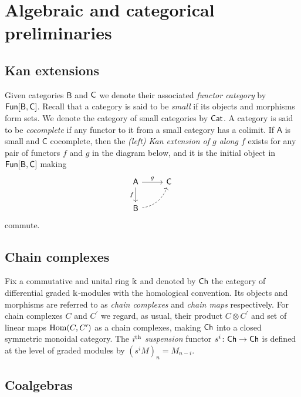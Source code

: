 
\section{Algebraic and categorical preliminaries} \label{s:preliminaries}

\subsection{Kan extensions}

Given categories $\mathsf{B}$ and $\mathsf{C}$ we denote their associated \textit{functor category} by $\mathsf{Fun}[\mathsf{B}, \mathsf{C}]$.
Recall that a category is said to be \textit{small} if its objects and morphisms form sets.
We denote the category of small categories by $\mathsf{Cat}$.
A category is said to be \textit{cocomplete} if any functor to it from a small category has a colimit.
If $\mathsf{A}$ is small and $\mathsf{C}$ cocomplete, then the \textit{(left) Kan extension of $g$ along $f$} exists for any pair of functors $f$ and $g$ in the diagram below, and it is the initial object in $\mathsf{Fun}[\mathsf{B}, \mathsf{C}]$ making
\[
\begin{tikzcd}[column sep=normal, row sep=normal]
\mathsf{A} \arrow[d, "f"'] \arrow[r, "g"] & \mathsf{C} \\ 
\mathsf{B} \arrow[dashed, ur, bend right] & \quad 
\end{tikzcd}
\]
commute.

\subsection{Chain complexes}

Fix a commutative and unital ring $\Bbbk$ and denoted by $\mathsf{Ch}$ the category of differential graded $\Bbbk$-modules with the homological convention.
Its objects and morphisms are referred to as \textit{chain complexes} and \textit{chain maps} respectively.
For chain complexes $C$ and $C^\prime$ we regard, as usual, their product $C \otimes C^\prime$ and set of linear maps $\mathrm{Hom}(C, C^\prime)$ as a chain complexes, making $\mathsf{Ch}$ into a closed symmetric monoidal category.
The $i^\mathrm{th}$ \textit{suspension} functor $s^i \colon \mathsf{Ch} \to \mathsf{Ch}$ is defined at the level of graded modules by $(s^{i}M)_n = M_{n-i}$.

\subsection{Coalgebras} \label{ss:coalgebras}

